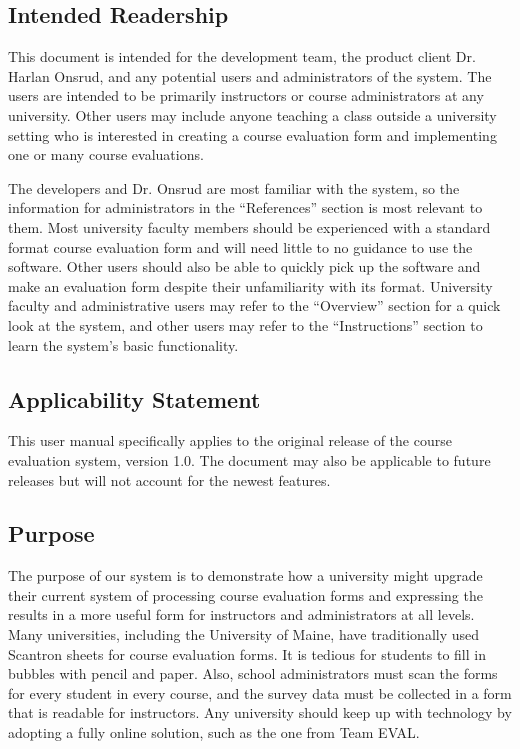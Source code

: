 \documentclass{article}
\begin{document}
\subsection{Intended Readership}

This document is intended for the development team, the product client Dr. Harlan Onsrud, and any potential users and administrators of the system. The users are intended to be primarily instructors or course administrators at any university. Other users may include anyone teaching a class outside a university setting who is interested in creating a course evaluation form and implementing one or many course evaluations.

The developers and Dr. Onsrud are most familiar with the system, so the information for administrators in the ``References'' section is most relevant to them. Most university faculty members should be experienced with a standard format course evaluation form and will need little to no guidance to use the software. Other users should also be able to quickly pick up the software and make an evaluation form despite their unfamiliarity with its format. University faculty and administrative users may refer to the ``Overview'' section for a quick look at the system, and other users may refer to the ``Instructions'' section to learn the system's basic functionality.

\subsection{Applicability Statement}

This user manual specifically applies to the original release of the course evaluation system, version 1.0. The document may also be applicable to future releases but will not account for the newest features.

\subsection{Purpose}

The purpose of our system is to demonstrate how a university might upgrade their current system of processing course evaluation forms and expressing the results in a more useful form for instructors and administrators at all levels. Many universities, including the University of Maine, have traditionally used Scantron sheets for course evaluation forms. It is tedious for students to fill in bubbles with pencil and paper. Also, school administrators must scan the forms for every student in every course, and the survey data must be collected in a form that is readable for instructors. Any university should keep up with technology by adopting a fully online solution, such as the one from Team EVAL.
\end{document}
